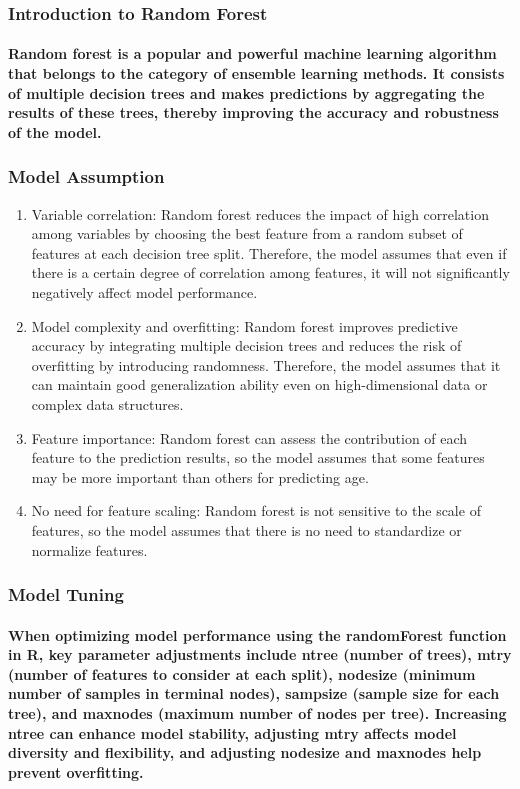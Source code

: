 \documentclass[11pt]{article} %
\begin{document}
\subsubsection{Introduction to Random Forest}
\paragraph{Random forest is a popular and powerful machine learning algorithm that belongs to the category of ensemble learning methods. It consists of multiple decision trees and makes predictions by aggregating the results of these trees, thereby improving the accuracy and robustness of the model.}
\subsubsection{Model Assumption}
\begin{enumerate}
    \item Variable correlation: Random forest reduces the impact of high correlation among variables by choosing the best feature from a random subset of features at each decision tree split. Therefore, the model assumes that even if there is a certain degree of correlation among features, it will not significantly negatively affect model performance.
    \item Model complexity and overfitting: Random forest improves predictive accuracy by integrating multiple decision trees and reduces the risk of overfitting by introducing randomness. Therefore, the model assumes that it can maintain good generalization ability even on high-dimensional data or complex data structures.
    \item Feature importance: Random forest can assess the contribution of each feature to the prediction results, so the model assumes that some features may be more important than others for predicting age.
    \item No need for feature scaling: Random forest is not sensitive to the scale of features, so the model assumes that there is no need to standardize or normalize features.
\end{enumerate}
% 
\subsubsection{Model Tuning}
% 
\paragraph{When optimizing model performance using the randomForest function in R, key parameter adjustments include ntree (number of trees), mtry (number of features to consider at each split), nodesize (minimum number of samples in terminal nodes), sampsize (sample size for each tree), and maxnodes (maximum number of nodes per tree). Increasing ntree can enhance model stability, adjusting mtry affects model diversity and flexibility, and adjusting nodesize and maxnodes help prevent overfitting.}
\end{document}
